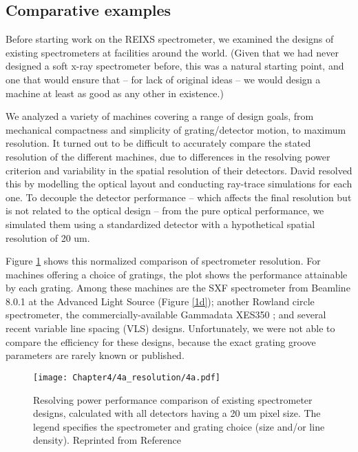 \subsection{Comparative examples}
Before starting work on the REIXS spectrometer, we examined the designs of existing spectrometers at facilities around the world.  (Given that we had never designed a soft x-ray spectrometer before, this was a natural starting point, and one that would ensure that -- for lack of original ideas -- we would design a machine at least as good as any other in existence.)

We analyzed a variety of machines covering a range of design goals, from mechanical compactness and simplicity of grating/detector motion, to maximum resolution.  It turned out to be difficult to accurately compare the stated resolution of the different machines, due to differences in the resolving power criterion and variability in the spatial resolution of their detectors.  David resolved this by modelling the optical layout and conducting ray-trace simulations for each one.  To decouple the detector performance -- which affects the final resolution but is not related to the optical design -- from the pure optical performance, we simulated them using a standardized detector with a hypothetical spatial resolution of 20 um.  

Figure \ref{4a} shows this normalized comparison of spectrometer resolution.  For machines offering a choice of gratings, the plot shows the performance attainable by each grating.  Among these machines are the SXF spectrometer from Beamline 8.0.1 at the Advanced Light Source \cite{Jia95} (Figure \ref{1d}); another Rowland circle spectrometer, the commercially-available Gammadata XES350 \cite{xes350}; and several recent variable line spacing (VLS) designs.  Unfortunately, we were not able to compare the efficiency for these designs, because the exact grating groove parameters are rarely known or published.
          
\begin{figure}[htbp] %
   \centering
   \texttt{[image: Chapter4/4a\_resolution/4a.pdf]} 
   \caption[Resolving power performance comparison of existing spectrometer designs, calculated with all detectors having a 20 um pixel size.]{Resolving power performance comparison of existing spectrometer designs, calculated with all detectors having a 20 um pixel size. The legend specifies the spectrometer and grating choice (size and/or line density).  Reprinted from Reference \cite[Figure 3.2]{Mui06}}
   \label{4a}
\end{figure}

